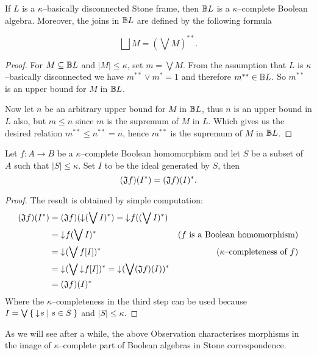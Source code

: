 \begin{lemma}\label{p:kappaComplStoneFrm}
    If $L$ is a $\kappa$--basically disconnected Stone frame, then $\mathbb{B} L$ is a $\kappa$--complete Boolean algebra. Moreover, the joins in $\mathbb{B} L$ are defined by the following formula

    $$\bigsqcup M = (\bigvee M)^{**}.$$
\end{lemma}
\begin{proof}
    For $M \subseteq \mathbb{B} L$ and $|M| \leq \kappa$, set $m = \bigvee M$. From the assumption that $L$ is $\kappa$--basically disconnected we have $m^{**} \vee m^* = 1$ and therefore $m^{**} \in \mathbb{B} L$. So $m^{**}$ is an upper bound for $M$ in $\mathbb{B} L$.

    Now let $n$ be an arbitrary upper bound for $M$ in $\mathbb{B} L$, thus $n$ is an upper bound in $L$ also, but $m \leq n$ since $m$ is the supremum of $M$ in $L$. Which gives us the desired relation $m^{**} \leq n^{**} = n$, hence $m^{**}$ is the supremum of $M$ in $\mathbb{B} L$.
\end{proof}

\begin{observation}
    Let $f\colon A \to B$ be a $\kappa$--complete Boolean homomorphism and let $S$ be a subset of $A$ such that $|S| \leq \kappa$. Set $I$ to be the ideal generated by $S$, then
    $$(\mathfrak{J} f)(I^*) = (\mathfrak{J} f)(I)^*.$$
\end{observation}
\begin{proof}
    The result is obtained by simple computation:
    \begin{align*}
        (\mathfrak{J} f)(I^*) &= (\mathfrak{J} f)(\mathord{\downarrow}\mkern1mu (\bigvee I)^*) = \mathord{\downarrow}\mkern1mu f((\bigvee I)^*) \\
                &= \mathord{\downarrow}\mkern1mu f(\bigvee I)^* & \text{($f$ is a Boolean homomorphism)} \\
                &= \mathord{\downarrow}\mkern1mu (\bigvee f[I])^* & \text{($\kappa$--completeness of $f$)} \\
                &= \mathord{\downarrow}\mkern1mu (\bigvee \mathord{\downarrow}\mkern1mu f[I])^* = \mathord{\downarrow}\mkern1mu (\bigvee (\mathfrak{J} f)(I))^* \\
                &= (\mathfrak{J} f)(I)^*
    \end{align*}
    Where the $\kappa$--completeness in the third step can be used because $I = \bigvee \Set{ \mathord{\downarrow}\mkern1mus | s \in S }$ and $|S| \leq \kappa$.
\end{proof}

As we will see after a while, the above Observation characterises morphisms in the image of $\kappa$--complete part of Boolean algebras in Stone correspondence.

